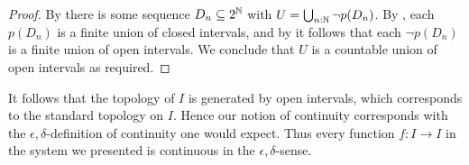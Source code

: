 \begin{proof}
  By 
  there is some sequence $D_n\subseteq 2^{\mathbb{N}}$ 
  with $U = \bigcup_{n:\mathbb{N}} \neg p(D_n)$. 
  By , each $p(D_n)$ is a finite union of closed intervals, 
  and by  it follows that each $\neg p(D_n)$ is a finite union of open intervals. 
  We conclude that $U$ is a countable union of open intervals as required. 
\end{proof}
%
%

\begin{remark}
  It follows that the topology of $I$ is generated by open intervals, 
  which corresponds to the standard topology on $I$. 
  Hence our notion of continuity corresponds with the $\epsilon,\delta$-definition of continuity one would expect. 
  Thus every function $f:I\to I$ in the system we presented is continuous in the $\epsilon,\delta$-sense. 
\end{remark}
